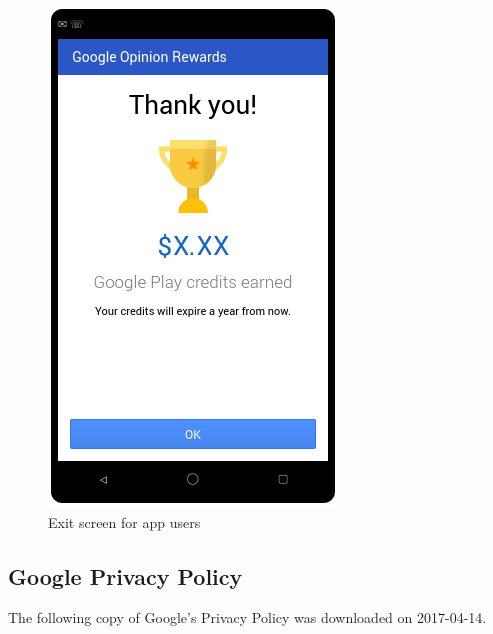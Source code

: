 \begin{figure}
	\includegraphics{Selection_364.png}
	\caption{\label{fig:app:exit}Exit screen for app users}
\end{figure}

\FloatBarrier
\subsection{Google Privacy Policy}
\label{sec:gcs_privacy}
The following copy of Google's Privacy Policy was downloaded on 2017-04-14.



